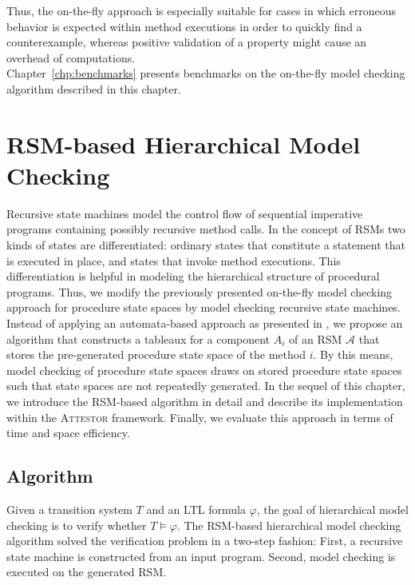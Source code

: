 \documentclass[a4paper, 12pt, twoside]{report}
\begin{document}
	Thus, the on-the-fly approach is especially suitable for cases in which erroneous behavior is expected within method executions in order to quickly find a counterexample, whereas positive validation of a property might cause an overhead of computations. \\
	
	Chapter~\ref{chp:benchmarks} presents benchmarks on the on-the-fly model checking algorithm described in this chapter.
	
	\chapter{RSM-based Hierarchical Model Checking}\label{chp:hmc}

	Recursive state machines model the control flow of sequential imperative programs containing possibly recursive method calls. In the concept of RSMs two kinds of states are differentiated: ordinary states that constitute a statement that is executed in place, and states that invoke method executions. This differentiation is helpful in modeling the hierarchical structure of procedural programs. Thus, we modify the previously presented on-the-fly model checking approach for procedure state spaces by model checking recursive state machines. Instead of applying an automata-based approach as presented in \cite{alur2001analysis}, we propose an algorithm that constructs a tableaux for a component $A_i$ of an RSM $\mathcal{A}$ that stores the pre-generated procedure state space of the method $i$. By this means, model checking of procedure state spaces draws on stored procedure state spaces such that state spaces are not repeatedly generated. In the sequel of this chapter, we introduce the RSM-based algorithm in detail and describe its implementation within the \textsc{Attestor} framework. Finally, we evaluate this approach in terms of time and space efficiency.

	\section{Algorithm}
	
	Given a transition system $T$ and an LTL formula $\varphi$, the goal of hierarchical model checking is to verify whether $T \models \varphi$. The RSM-based hierarchical model checking algorithm solved the verification problem in a two-step fashion: First, a recursive state machine is constructed from an input program. Second, model checking is executed on the generated RSM.\\
	
\end{document}
